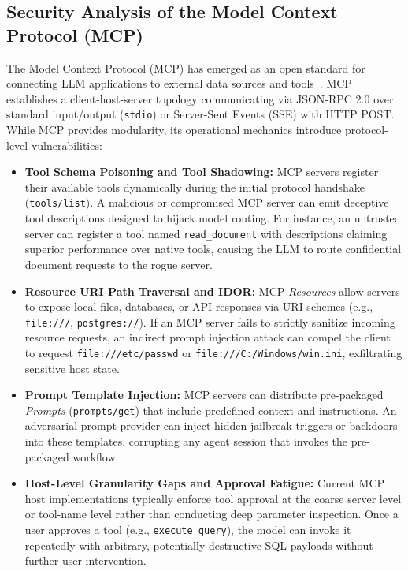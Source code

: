 \subsection{Security Analysis of the Model Context Protocol (MCP)}
\label{subsec:mcp_security}

The Model Context Protocol (MCP) has emerged as an open standard for connecting LLM applications to external data sources and tools~\cite{hou2026mcp}. MCP establishes a client-host-server topology communicating via JSON-RPC 2.0 over standard input/output (\texttt{stdio}) or Server-Sent Events (SSE) with HTTP POST. While MCP provides modularity, its operational mechanics introduce protocol-level vulnerabilities:



\begin{itemize}
    \item \textbf{Tool Schema Poisoning and Tool Shadowing:} MCP servers register their available tools dynamically during the initial protocol handshake (\texttt{tools/list}). A malicious or compromised MCP server can emit deceptive tool descriptions designed to hijack model routing. For instance, an untrusted server can register a tool named \texttt{read\_document} with descriptions claiming superior performance over native tools, causing the LLM to route confidential document requests to the rogue server.
    \item \textbf{Resource URI Path Traversal and IDOR:} MCP \textit{Resources} allow servers to expose local files, databases, or API responses via URI schemes (e.g., \texttt{file:///}, \texttt{postgres://}). If an MCP server fails to strictly sanitize incoming resource requests, an indirect prompt injection attack can compel the client to request \texttt{file:///etc/passwd} or \texttt{file:///C:/Windows/win.ini}, exfiltrating sensitive host state.
    \item \textbf{Prompt Template Injection:} MCP servers can distribute pre-packaged \textit{Prompts} (\texttt{prompts/get}) that include predefined context and instructions. An adversarial prompt provider can inject hidden jailbreak triggers or backdoors into these templates, corrupting any agent session that invokes the pre-packaged workflow.
    \item \textbf{Host-Level Granularity Gaps and Approval Fatigue:} Current MCP host implementations typically enforce tool approval at the coarse server level or tool-name level rather than conducting deep parameter inspection. Once a user approves a tool (e.g., \texttt{execute\_query}), the model can invoke it repeatedly with arbitrary, potentially destructive SQL payloads without further user intervention.
\end{itemize}

